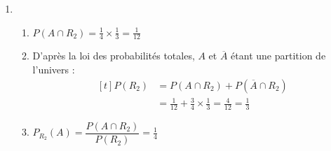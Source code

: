 \documentclass{scrartcl}
\begin{document}
\begin{adjustwidth}{2em}{0pt}
\begin{enumerate}
            \item   \begin{enumerate}[label=\alph*)]
                        \item	$P(A\cap R_2)=\frac{1}{4}\times\frac{1}{3}=\boxed{\frac{1}{12}}$
                        \item   D'après la loi des probabilités totales, $A$ et $\overline{A}$ étant une partition de l'univers : 
                                \[\begin{aligned}[t]
                                    P(R_2)&=P(A\cap R_2)+P(\overline{A}\cap R_2) \\
                                    &=\frac{1}{12}+\frac{3}{4}\times\frac{1}{3}=\frac{4}{12}=\boxed{\frac{1}{3}}
                                \end{aligned}\]
                        \item   $P_{R_2}(A)=\dfrac{P(A\cap R_2)}{P(R_2)}=\boxed{\frac{1}{4}}$
                    \end{enumerate}
                    

\end{enumerate}
\end{adjustwidth}
\end{document}
